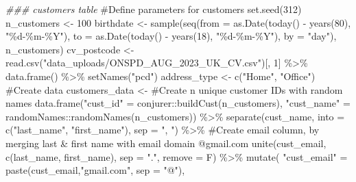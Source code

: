 \documentclass[
  letterpaper,
  DIV=11,
  numbers=noendperiod]{scrartcl}
\newenvironment{Shaded}{\begin{snugshade}}{\end{snugshade}}
\newcommand{\AttributeTok}[1]{\textcolor[rgb]{0.40,0.45,0.13}{#1}}
\newcommand{\CommentTok}[1]{\textcolor[rgb]{0.37,0.37,0.37}{#1}}
\newcommand{\DecValTok}[1]{\textcolor[rgb]{0.68,0.00,0.00}{#1}}
\newcommand{\DocumentationTok}[1]{\textcolor[rgb]{0.37,0.37,0.37}{\textit{#1}}}
\newcommand{\FunctionTok}[1]{\textcolor[rgb]{0.28,0.35,0.67}{#1}}
\newcommand{\NormalTok}[1]{\textcolor[rgb]{0.00,0.23,0.31}{#1}}
\newcommand{\OtherTok}[1]{\textcolor[rgb]{0.00,0.23,0.31}{#1}}
\newcommand{\SpecialCharTok}[1]{\textcolor[rgb]{0.37,0.37,0.37}{#1}}
\newcommand{\StringTok}[1]{\textcolor[rgb]{0.13,0.47,0.30}{#1}}
\begin{document}
\begin{Shaded}
\begin{Highlighting}[numbers=left,,]
\DocumentationTok{\#\#\# \textquotesingle{}customers\textquotesingle{} table}
\CommentTok{\#Define parameters for customers}
\FunctionTok{set.seed}\NormalTok{(}\DecValTok{312}\NormalTok{)}
\NormalTok{n\_customers }\OtherTok{\textless{}{-}} \DecValTok{100}
\NormalTok{birthdate }\OtherTok{\textless{}{-}} \FunctionTok{sample}\NormalTok{(}\FunctionTok{seq}\NormalTok{(}\AttributeTok{from =} \FunctionTok{as.Date}\NormalTok{(}\FunctionTok{today}\NormalTok{() }\SpecialCharTok{{-}} \FunctionTok{years}\NormalTok{(}\DecValTok{80}\NormalTok{), }\StringTok{"\%d{-}\%m{-}\%Y"}\NormalTok{), }
                        \AttributeTok{to =} \FunctionTok{as.Date}\NormalTok{(}\FunctionTok{today}\NormalTok{() }\SpecialCharTok{{-}} \FunctionTok{years}\NormalTok{(}\DecValTok{18}\NormalTok{), }\StringTok{"\%d{-}\%m{-}\%Y"}\NormalTok{), }\AttributeTok{by =} \StringTok{"day"}\NormalTok{),}
\NormalTok{                    n\_customers)}
\NormalTok{cv\_postcode }\OtherTok{\textless{}{-}} 
  \FunctionTok{read.csv}\NormalTok{(}\StringTok{"data\_uploads/ONSPD\_AUG\_2023\_UK\_CV.csv"}\NormalTok{)[, }\DecValTok{1}\NormalTok{] }\SpecialCharTok{\%\textgreater{}\%} 
  \FunctionTok{data.frame}\NormalTok{() }\SpecialCharTok{\%\textgreater{}\%} 
  \FunctionTok{setNames}\NormalTok{(}\StringTok{"pcd"}\NormalTok{)}
\NormalTok{address\_type }\OtherTok{\textless{}{-}} \FunctionTok{c}\NormalTok{(}\StringTok{"Home"}\NormalTok{, }\StringTok{"Office"}\NormalTok{)}
\CommentTok{\#Create data}
\NormalTok{customers\_data }\OtherTok{\textless{}{-}} 
  \CommentTok{\#Create n unique customer IDs with random names}
  \FunctionTok{data.frame}\NormalTok{(}\StringTok{"cust\_id"} \OtherTok{=}\NormalTok{ conjurer}\SpecialCharTok{::}\FunctionTok{buildCust}\NormalTok{(n\_customers),}
             \StringTok{"cust\_name"} \OtherTok{=}\NormalTok{ randomNames}\SpecialCharTok{::}\FunctionTok{randomNames}\NormalTok{(n\_customers)) }\SpecialCharTok{\%\textgreater{}\%} 
  \FunctionTok{separate}\NormalTok{(cust\_name, }\AttributeTok{into =} \FunctionTok{c}\NormalTok{(}\StringTok{"last\_name"}\NormalTok{, }\StringTok{"first\_name"}\NormalTok{), }\AttributeTok{sep =} \StringTok{", "}\NormalTok{) }\SpecialCharTok{\%\textgreater{}\%}
  \CommentTok{\#Create email column, by merging last \& first name with email domain @gmail.com}
  \FunctionTok{unite}\NormalTok{(cust\_email, }\FunctionTok{c}\NormalTok{(last\_name, first\_name), }\AttributeTok{sep =} \StringTok{"."}\NormalTok{, }\AttributeTok{remove =}\NormalTok{ F) }\SpecialCharTok{\%\textgreater{}\%}
  \FunctionTok{mutate}\NormalTok{(}
    \StringTok{"cust\_email"} \OtherTok{=} \FunctionTok{paste}\NormalTok{(cust\_email,}\StringTok{"gmail.com"}\NormalTok{, }\AttributeTok{sep =} \StringTok{"@"}\NormalTok{),}

\end{Highlighting}
\end{Shaded}
\end{document}
